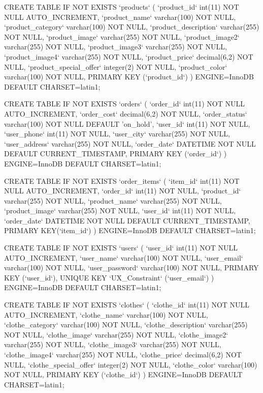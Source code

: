 CREATE TABLE IF NOT EXISTS `products` (
    `product_id` int(11) NOT NULL AUTO_INCREMENT,
    `product_name` varchar(100) NOT NULL,
    `product_category` varchar(100) NOT NULL,
    `product_description` varchar(255) NOT NULL,
    `product_image` varchar(255) NOT NULL,
    `product_image2` varchar(255) NOT NULL,
    `product_image3` varchar(255) NOT NULL,
    `product_image4` varchar(255) NOT NULL,
    `product_price` decimal(6,2) NOT NULL,
    `product_special_offer` integer(2) NOT NULL,
    `product_color` varchar(100) NOT NULL,
    PRIMARY KEY (`product_id`)
) ENGINE=InnoDB DEFAULT CHARSET=latin1;

CREATE TABLE IF NOT EXISTS `orders` (
    `order_id` int(11) NOT NULL AUTO_INCREMENT,
    `order_cost` decimal(6,2) NOT NULL,
    `order_status` varchar(100) NOT NULL DEFAULT 'on_hold',
    `user_id` int(11) NOT NULL,
    `user_phone` int(11) NOT NULL,
    `user_city` varchar(255) NOT NULL,
    `user_address` varchar(255) NOT NULL,
    `order_date` DATETIME NOT NULL DEFAULT CURRENT_TIMESTAMP,
    PRIMARY KEY (`order_id`)
) ENGINE=InnoDB DEFAULT CHARSET=latin1;

CREATE TABLE IF NOT EXISTS `order_items` (
    `item_id` int(11) NOT NULL AUTO_INCREMENT,
    `order_id` int(11) NOT NULL,
    `product_id` varchar(255) NOT NULL,
    `product_name` varchar(255) NOT NULL,
    `product_image` varchar(255) NOT NULL,
    `user_id` int(11) NOT NULL,
    `order_date` DATETIME NOT NULL DEFAULT CURRENT_TIMESTAMP,
    PRIMARY KEY(`item_id`)
) ENGINE=InnoDB DEFAULT CHARSET=latin1;

CREATE TABLE IF NOT EXISTS `users` (
    `user_id` int(11) NOT NULL AUTO_INCREMENT,
    `user_name` varchar(100) NOT NULL,
    `user_email` varchar(100) NOT NULL,
    `user_password` varchar(100) NOT NULL,
    PRIMARY KEY (`user_id`),
    UNIQUE KEY `UX_Constraint` (`user_email`)
) ENGINE=InnoDB DEFAULT CHARSET=latin1;

CREATE TABLE IF NOT EXISTS `clothes` (
    `clothe_id` int(11) NOT NULL AUTO_INCREMENT,
    `clothe_name` varchar(100) NOT NULL,
    `clothe_category` varchar(100) NOT NULL,
    `clothe_description` varchar(255) NOT NULL,
    `clothe_image` varchar(255) NOT NULL,
    `clothe_image2` varchar(255) NOT NULL,
    `clothe_image3` varchar(255) NOT NULL,
    `clothe_image4` varchar(255) NOT NULL,
    `clothe_price` decimal(6,2) NOT NULL,
    `clothe_special_offer` integer(2) NOT NULL,
    `clothe_color` varchar(100) NOT NULL,
    PRIMARY KEY (`clothe_id`)
) ENGINE=InnoDB DEFAULT CHARSET=latin1;

